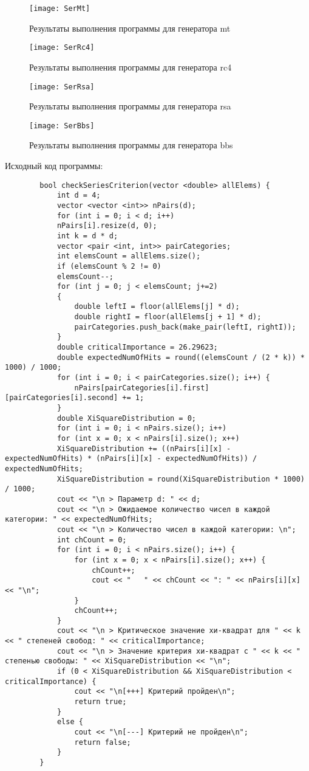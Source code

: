 \documentclass[bachelor, och, coursework]{shiza}
\begin{document}
	\begin{figure}[H]
		\centering
		\texttt{[image: SerMt]}
		\caption{Результаты выполнения программы для генератора mt}
		\label{fig:SerMt}
	\end{figure}		
	
	\begin{figure}[H]
		\centering
		\texttt{[image: SerRc4]}
		\caption{Результаты выполнения программы для генератора rc4}
		\label{fig:SerRc4}
	\end{figure}
	
	\begin{figure}[H]
		\centering
		\texttt{[image: SerRsa]}
		\caption{Результаты выполнения программы для генератора rsa}
		\label{fig:SerRsa}
	\end{figure}
	
	\begin{figure}[H]
		\centering
		\texttt{[image: SerBbs]}
		\caption{Результаты выполнения программы для генератора bbs}
		\label{fig:SerBbs}
	\end{figure}
	
	Исходный код программы:
	
	\begin{verbatim}
		bool checkSeriesCriterion(vector <double> allElems) {
			int d = 4;
			vector <vector <int>> nPairs(d);
			for (int i = 0; i < d; i++)
			nPairs[i].resize(d, 0);
			int k = d * d;
			vector <pair <int, int>> pairCategories;
			int elemsCount = allElems.size();
			if (elemsCount % 2 != 0)
			elemsCount--;
			for (int j = 0; j < elemsCount; j+=2)
			{
				double leftI = floor(allElems[j] * d);
				double rightI = floor(allElems[j + 1] * d);
				pairCategories.push_back(make_pair(leftI, rightI));
			}
			double criticalImportance = 26.29623;
			double expectedNumOfHits = round((elemsCount / (2 * k)) * 1000) / 1000;
			for (int i = 0; i < pairCategories.size(); i++) {
				nPairs[pairCategories[i].first][pairCategories[i].second] += 1;
			}
			double XiSquareDistribution = 0;
			for (int i = 0; i < nPairs.size(); i++)
			for (int x = 0; x < nPairs[i].size(); x++)
			XiSquareDistribution += ((nPairs[i][x] - expectedNumOfHits) * (nPairs[i][x] - expectedNumOfHits)) / expectedNumOfHits;
			XiSquareDistribution = round(XiSquareDistribution * 1000) / 1000;
			cout << "\n > Параметр d: " << d;
			cout << "\n > Ожидаемое количество чисел в каждой категории: " << expectedNumOfHits;
			cout << "\n > Количество чисел в каждой категории: \n";
			int chCount = 0;
			for (int i = 0; i < nPairs.size(); i++) {
				for (int x = 0; x < nPairs[i].size(); x++) {
					chCount++;
					cout << "   " << chCount << ": " << nPairs[i][x] << "\n";
				}
				chCount++;
			}
			cout << "\n > Критическое значение хи-квадрат для " << k << " степеней свобод: " << criticalImportance;
			cout << "\n > Значение критерия хи-квадрат с " << k << " степенью свободы: " << XiSquareDistribution << "\n";
			if (0 < XiSquareDistribution && XiSquareDistribution < criticalImportance) {
				cout << "\n[+++] Критерий пройден\n";
				return true;
			}
			else {
				cout << "\n[---] Критерий не пройден\n";
				return false;
			}
		}
	\end{verbatim}
	
\end{document}
